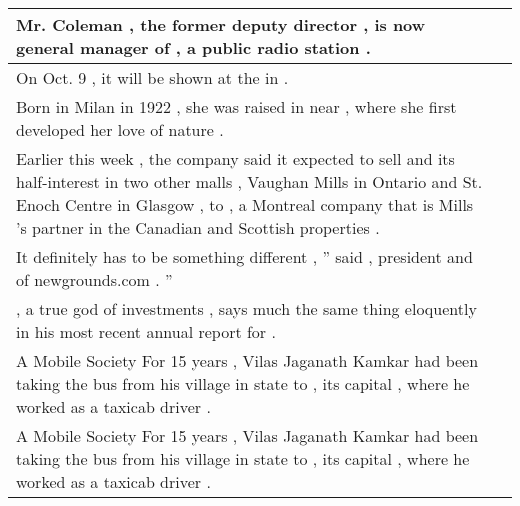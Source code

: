 \begin{table}
\begin{tabular}{p{} P{1,4cm} }
\hline
{} {Mr. Coleman , the former deputy director , is now general manager of \underline{} , a \underline{} public radio station .} &    \\ 
\hline
{} {On Oct. 9 , it will be shown at the \underline{} in \underline{} .} &    \\ 
\hline
{} {Born in Milan in 1922 , she was raised in \underline{} near \underline{} , where she first developed her love of nature .} &    \\ 
\hline
{} {Earlier this week , the company said it expected to sell \underline{} and its half-interest in two other malls , Vaughan Mills in Ontario and St. Enoch Centre in Glasgow , to \underline{} , a Montreal company that is Mills 's partner in the Canadian and Scottish properties .} &    \\ 
\hline
{} {It definitely has to be something different , '' said \underline{} , president and \underline{} of newgrounds.com . ''} &    \\ 
\hline
{} {\underline{} , a true god of investments , says much the same thing eloquently in his most recent annual report for \underline{} .} &    \\ 
\hline
{} {A Mobile Society For 15 years , Vilas Jaganath Kamkar had been taking the bus from his village in \underline{} state to \underline{} , its capital , where he worked as a taxicab driver .} &    \\ 
\hline
{} {A Mobile Society For 15 years , Vilas Jaganath Kamkar had been taking the bus from his village in \underline{} state to \underline{} , its capital , where he worked as a taxicab driver .} &    \\ 

\end{tabular}
\end{table}
